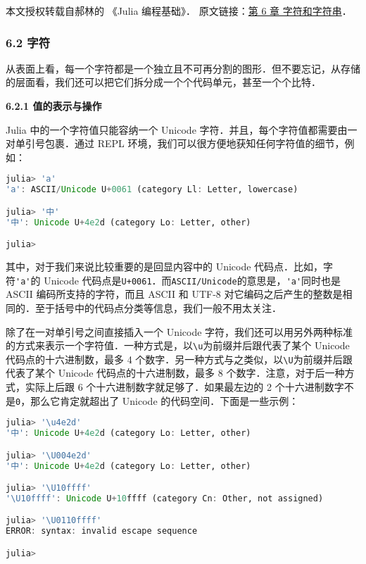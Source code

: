 
本文授权转载自郝林的 《Julia 编程基础》． 原文链接：\href{https://github.com/hyper0x/JuliaBasics/blob/master/book/ch06.md}{第 6 章 字符和字符串}．


\subsubsection{6.2 字符}

从表面上看，每一个字符都是一个独立且不可再分割的图形．但不要忘记，从存储的层面看，我们还可以把它们拆分成一个个代码单元，甚至一个个比特．

\textbf{6.2.1 值的表示与操作}

Julia 中的一个字符值只能容纳一个 Unicode 字符．并且，每个字符值都需要由一对单引号包裹．通过 REPL 环境，我们可以很方便地获知任何字符值的细节，例如：
\begin{lstlisting}[language=julia]
julia> 'a'
'a': ASCII/Unicode U+0061 (category Ll: Letter, lowercase)

julia> '中'
'中': Unicode U+4e2d (category Lo: Letter, other)

julia> 
\end{lstlisting}

其中，对于我们来说比较重要的是回显内容中的 Unicode 代码点．比如，字符\verb|'a'|的 Unicode 代码点是\verb|U+0061|．而\verb|ASCII/Unicode|的意思是，\verb|'a'|同时也是 ASCII 编码所支持的字符，而且 ASCII 和 UTF-8 对它编码之后产生的整数是相同的．至于括号中的代码点分类等信息，我们一般不用太关注．

除了在一对单引号之间直接插入一个 Unicode 字符，我们还可以用另外两种标准的方式来表示一个字符值．一种方式是，以\verb|\u|为前缀并后跟代表了某个 Unicode 代码点的十六进制数，最多 4 个数字．另一种方式与之类似，以\verb|\U|为前缀并后跟代表了某个 Unicode 代码点的十六进制数，最多 8 个数字．注意，对于后一种方式，实际上后跟 6 个十六进制数字就足够了．如果最左边的 2 个十六进制数字不是\verb|0|，那么它肯定就超出了 Unicode 的代码空间．下面是一些示例：
\begin{lstlisting}[language=julia]
julia> '\u4e2d'
'中': Unicode U+4e2d (category Lo: Letter, other)

julia> '\U004e2d'
'中': Unicode U+4e2d (category Lo: Letter, other)

julia> '\U10ffff'
'\U10ffff': Unicode U+10ffff (category Cn: Other, not assigned)

julia> '\U0110ffff'
ERROR: syntax: invalid escape sequence

julia> 
\end{lstlisting}

